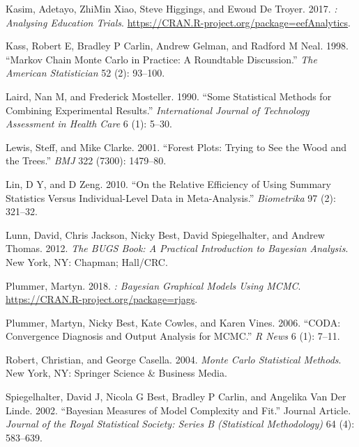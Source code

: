 \begin{CSLReferences}{1}{0}
\leavevmode{}%
Kasim, Adetayo, ZhiMin Xiao, Steve Higgings, and Ewoud De Troyer. 2017. \emph{: Analysing Education Trials}. \url{https://CRAN.R-project.org/package=eefAnalytics}.

\leavevmode{}%
Kass, Robert E, Bradley P Carlin, Andrew Gelman, and Radford M Neal. 1998. {``Markov Chain Monte Carlo in Practice: A Roundtable Discussion.''} \emph{The American Statistician} 52 (2): 93--100.

\leavevmode{}%
Laird, Nan M, and Frederick Mosteller. 1990. {``Some Statistical Methods for Combining Experimental Results.''} \emph{International Journal of Technology Assessment in Health Care} 6 (1): 5--30.

\leavevmode{}%
Lewis, Steff, and Mike Clarke. 2001. {``Forest Plots: Trying to See the Wood and the Trees.''} \emph{BMJ} 322 (7300): 1479--80.

\leavevmode{}%
Lin, D Y, and D Zeng. 2010. {``On the Relative Efficiency of Using Summary Statistics Versus Individual-Level Data in Meta-Analysis.''} \emph{Biometrika} 97 (2): 321--32.

\leavevmode{}%
Lunn, David, Chris Jackson, Nicky Best, David Spiegelhalter, and Andrew Thomas. 2012. \emph{The BUGS Book: A Practical Introduction to Bayesian Analysis}. New York, NY: Chapman; Hall/CRC.

\leavevmode{}%
Plummer, Martyn. 2018. \emph{: Bayesian Graphical Models Using MCMC}. \url{https://CRAN.R-project.org/package=rjags}.

\leavevmode{}%
Plummer, Martyn, Nicky Best, Kate Cowles, and Karen Vines. 2006. {``CODA: Convergence Diagnosis and Output Analysis for MCMC.''} \emph{R News} 6 (1): 7--11.

\leavevmode{}%
Robert, Christian, and George Casella. 2004. \emph{Monte Carlo Statistical Methods}. New York, NY: Springer Science \& Business Media.

\leavevmode{}%
Spiegelhalter, David J, Nicola G Best, Bradley P Carlin, and Angelika Van Der Linde. 2002. {``Bayesian Measures of Model Complexity and Fit.''} Journal Article. \emph{Journal of the Royal Statistical Society: Series B (Statistical Methodology)} 64 (4): 583--639.


\end{CSLReferences}
